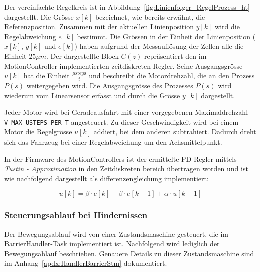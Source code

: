 \documentclass[main.tex]{subfiles} %
\begin{document}
Der vereinfachte Regelkreis ist in
Abbildung~\ref{fig:Linienfolger_RegelProzess_ht} dargestellt. Die Grösse $x[k]$
bezeichnet, wie bereits erwähnt, die Referenzposition. Zusammen mit der
aktuellen Linienposition $y[k]$ wird die Regelabweichung $e[k]$ bestimmt. Die
Grössen in der Einheit der Linienposition ($x[k]$, $y[k]$ und $e[k]$) haben
aufgrund der Messauflösung der Zellen alle die Einheit $25 \mu m$. Der
dargestellte Block $C(z)$ repräsentiert den im MotionController implementierten
zeitdiskreten Regler. Seine Ausgangsgrösse $u[k]$ hat die Einheit $\frac{\mu
        \text{steps}}{t}$ und beschreibt die Motordrehzahl, die an den Prozess $P(s)$
weitergegeben wird. Die Ausgangsgrösse des Prozesses $P(s)$ wird wiederum vom
Linearsensor erfasst und durch die Grösse $y[k]$ dargestellt.

Jeder Motor wird bei Geradeausfahrt mit einer vorgegebenen Maximaldrehzahl
\texttt{V\_MAX\_USTEPS\_PER\_T} angesteuert. Zu dieser Geschwindigkeit wird bei
einem Motor die Regelgrösse $u[k]$ addiert, bei dem anderen subtrahiert.
Dadurch dreht sich das Fahrzeug bei einer Regelabweichung um den
Achsmittelpunkt.

In der Firmware des MotionControllers ist der ermittelte PD-Regler mittels
\textit{Tustin - Approximation} in den Zeitdiskreten bereich übertragen worden
und ist wie nachfolgend dargestellt als differenzengleichung implementiert:

\[
    u[k] = \beta \cdot e[k] - \beta \cdot e[k - 1] + \alpha \cdot u[k - 1]
\]

\subsubsection*{Steuerungsablauf bei Hindernissen}

Der Bewegungsablauf wird von einer Zustandsmaschine gesteuert, die im
BarrierHandler-Task implementiert ist. Nachfolgend wird lediglich der
Bewegungsablauf beschrieben. Genauere Details zu dieser Zustandsmaschine sind
im Anhang~\ref{apdx:HandlerBarrierStm} dokumentiert.
\end{document}
